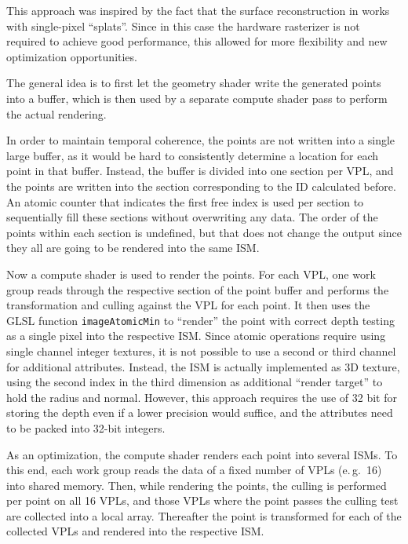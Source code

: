  This approach was inspired by the fact that the surface reconstruction in \cite{Marroquim:2007:reconstruction} works with single-pixel ``splats''. Since in this case the hardware rasterizer is not required to achieve good performance, this allowed for more flexibility and new optimization opportunities.

 The general idea is to first let the geometry shader write the generated points into a buffer, which is then used by a separate compute shader pass to perform the actual rendering.

 In order to maintain temporal coherence, the points are not written into a single large buffer, as it would be hard to consistently determine a location for each point in that buffer. Instead, the buffer is divided into one section per VPL, and the points are written into the section corresponding to the ID calculated before. An atomic counter that indicates the first free index is used per section to sequentially fill these sections without overwriting any data. The order of the points within each section is undefined, but that does not change the output since they all are going to be rendered into the same ISM.

 Now a compute shader is used to render the points. For each VPL, one work group reads through the respective section of the point buffer and performs the transformation and culling against the VPL for each point. It then uses the GLSL function \texttt{imageAtomicMin} to ``render'' the point with correct depth testing as a single pixel into the respective ISM. Since atomic operations require using single channel integer textures, it is not possible to use a second or third channel for additional attributes. Instead, the ISM is actually implemented as 3D texture, using the second index in the third dimension as additional ``render target'' to hold the radius and normal. However, this approach requires the use of 32 bit for storing the depth even if a lower precision would suffice, and the attributes need to be packed into 32-bit integers.

 As an optimization, the compute shader renders each point into several ISMs. To this end, each work group reads the data of a fixed number of VPLs (e.\,g.\ 16) into shared memory. Then, while rendering the points, the culling is performed per point on all 16 VPLs, and those VPLs where the point passes the culling test are collected into a local array. Thereafter the point is transformed for each of the collected VPLs and rendered into the respective ISM.

